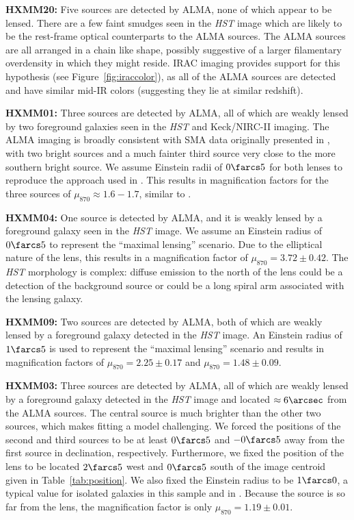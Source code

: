 \documentclass[iop]{emulateapj}
\begin{document}
{\bf HXMM20:} Five sources are detected by ALMA, none of which appear to be
lensed.  There are a few faint smudges seen in the {\it HST} image which are
likely to be the rest-frame optical counterparts to the ALMA sources.  The ALMA
sources are all arranged in a chain like shape, possibly suggestive of a larger
filamentary overdensity in which they might reside.  IRAC imaging provides
support for this hypothesis (see Figure~\ref{fig:iraccolor}), as all of the ALMA
sources are detected and have similar mid-IR colors (suggesting they lie at
similar redshift).

{\bf HXMM01:} Three sources are detected by ALMA, all of which are weakly lensed
by two foreground galaxies seen in the {\it HST} and Keck/NIRC-II imaging.  The
ALMA imaging is broadly consistent with SMA data originally presented in
\citet{Fu:2013lr}, with two bright sources and a much fainter third source very
close to the more southern bright source.  We assume Einstein radii of
$0\farcs5$ for both lenses to reproduce the approach used in \citet{Fu:2013lr}.
This results in magnification factors for the three sources of $\mu_{870}
\approx 1.6 - 1.7$, similar to \citet{Fu:2013lr}.

{\bf HXMM04:} One source is detected by ALMA, and it is weakly lensed by a
foreground galaxy seen in the {\it HST} image.  We assume an Einstein radius of
$0\farcs5$ to represent the ``maximal lensing'' scenario.  Due to the
elliptical nature of the lens, this results in a magnification factor of
$\mu_{870} = 3.72 \pm 0.42$.  The {\it HST} morphology is complex: diffuse
emission to the north of the lens could be a detection of the background source
or could be a long spiral arm associated with the lensing galaxy.

{\bf HXMM09:} Two sources are detected by ALMA, both of which are weakly
lensed by a foreground galaxy detected in the {\it HST} image.  An Einstein
radius of $1\farcs5$ is used to represent the ``maximal lensing'' scenario and
results in magnification factors of $\mu_{870} = 2.25 \pm 0.17$ and $\mu_{870}
= 1.48 \pm 0.09$.

{\bf HXMM03:} Three sources are detected by ALMA, all of which are weakly lensed
by a foreground galaxy detected in the {\it HST} image and located $\approx
6\arcsec$ from the ALMA sources.  The central source is much brighter than the
other two sources, which makes fitting a model challenging.  We forced the
positions of the second and third sources to be at least $0\farcs5$ and
$-0\farcs5$ away from the first source in declination, respectively.
Furthermore, we fixed the position of the lens to be located $2\farcs5$ west
and $0\farcs5$ south of the image centroid given in Table~\ref{tab:position}.
We also fixed the Einstein radius to be $1\farcs0$, a typical value for
isolated galaxies in this sample and in \citet{Bussmann:2013lr}.  Because the
source is so far from the lens, the magnification factor is only $\mu_{870} =
1.19 \pm 0.01$.
\end{document}
